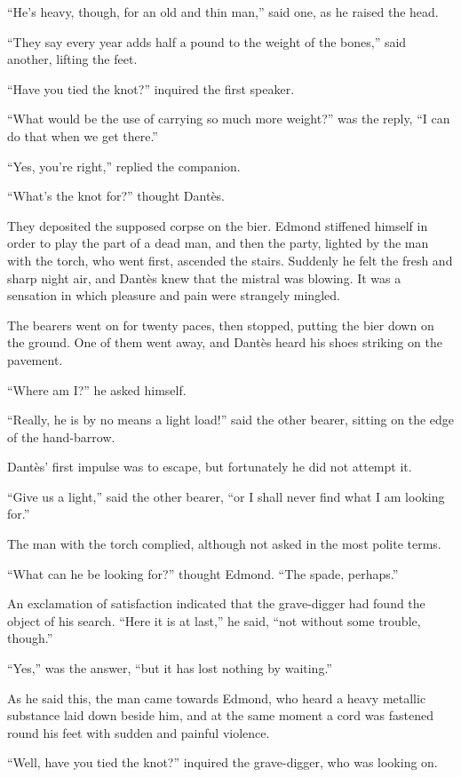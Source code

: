 “He’s heavy, though, for an old and thin man,” said one, as he raised
the head.

“They say every year adds half a pound to the weight of the bones,”
said another, lifting the feet.

“Have you tied the knot?” inquired the first speaker.

“What would be the use of carrying so much more weight?” was the reply,
“I can do that when we get there.”

“Yes, you’re right,” replied the companion.

“What’s the knot for?” thought Dantès.

They deposited the supposed corpse on the bier. Edmond stiffened
himself in order to play the part of a dead man, and then the party,
lighted by the man with the torch, who went first, ascended the stairs.
Suddenly he felt the fresh and sharp night air, and Dantès knew that
the mistral was blowing. It was a sensation in which pleasure and pain
were strangely mingled.

The bearers went on for twenty paces, then stopped, putting the bier
down on the ground. One of them went away, and Dantès heard his shoes
striking on the pavement.

“Where am I?” he asked himself.

“Really, he is by no means a light load!” said the other bearer,
sitting on the edge of the hand-barrow.

Dantès’ first impulse was to escape, but fortunately he did not attempt
it.

“Give us a light,” said the other bearer, “or I shall never find what I
am looking for.”

The man with the torch complied, although not asked in the most polite
terms.

“What can he be looking for?” thought Edmond. “The spade, perhaps.”

An exclamation of satisfaction indicated that the grave-digger had
found the object of his search. “Here it is at last,” he said, “not
without some trouble, though.”

“Yes,” was the answer, “but it has lost nothing by waiting.”

As he said this, the man came towards Edmond, who heard a heavy
metallic substance laid down beside him, and at the same moment a cord
was fastened round his feet with sudden and painful violence.

“Well, have you tied the knot?” inquired the grave-digger, who was
looking on.

